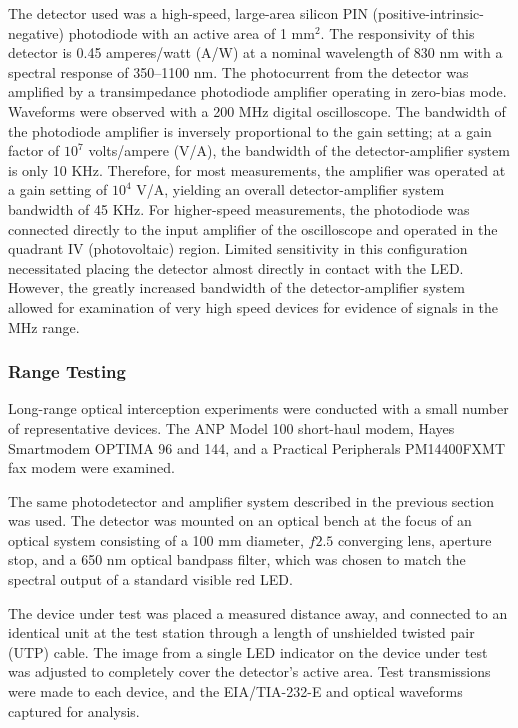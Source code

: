 \documentclass[twocolumn]{article}
\begin{document}
The detector used was a high-speed, large-area silicon PIN (positive-intrinsic-negative) photodiode with an active area of 1 $\mathrm{mm}^2$.  The responsivity of this detector is 0.45 amperes/watt (A/W) at a nominal wavelength of 830 nm with a spectral response of 350--1100 nm.  The photocurrent from the detector was amplified by a transimpedance photodiode amplifier operating in zero-bias mode.  Waveforms were observed with a 200 MHz digital oscilloscope.  The bandwidth of the photodiode amplifier is inversely proportional to the gain setting; at a gain factor of $10^7$ volts/ampere (V/A), the bandwidth of the detector-amplifier system is only 10 KHz.  Therefore, for most measurements, the amplifier was operated at a gain setting of $10^4$ V/A, yielding an overall detector-amplifier system bandwidth of 45 KHz.  For higher-speed measurements, the photodiode was connected directly to the input amplifier of the oscilloscope and operated in the quadrant IV (photovoltaic) region.  Limited sensitivity in this configuration necessitated placing the detector almost directly in contact with the LED.  However, the greatly increased bandwidth of the detector-amplifier system allowed for examination of very high speed devices for evidence of signals in the MHz range.

\subsubsection{Range Testing}

Long-range optical interception experiments were conducted with a small number of representative devices.  The ANP Model 100 short-haul modem, Hayes Smartmodem OPTIMA 96 and 144, and a Practical Peripherals PM14400FXMT fax modem were examined.

The same photodetector and amplifier system described in the previous section was used.  The detector was mounted on an optical bench at the focus of an optical system consisting of a 100 mm diameter, $f2.5$ converging lens, aperture stop, and a 650 nm optical bandpass filter, which was chosen to match the spectral output of a standard visible red LED.

The device under test was placed a measured distance away, and connected to an identical unit at the test station through a length of unshielded twisted pair (UTP) cable.  The image from a single LED indicator on the device under test was adjusted to completely cover the detector's active area.  Test transmissions were made to each device, and the EIA/TIA-232-E and optical waveforms captured for analysis.
\end{document}
